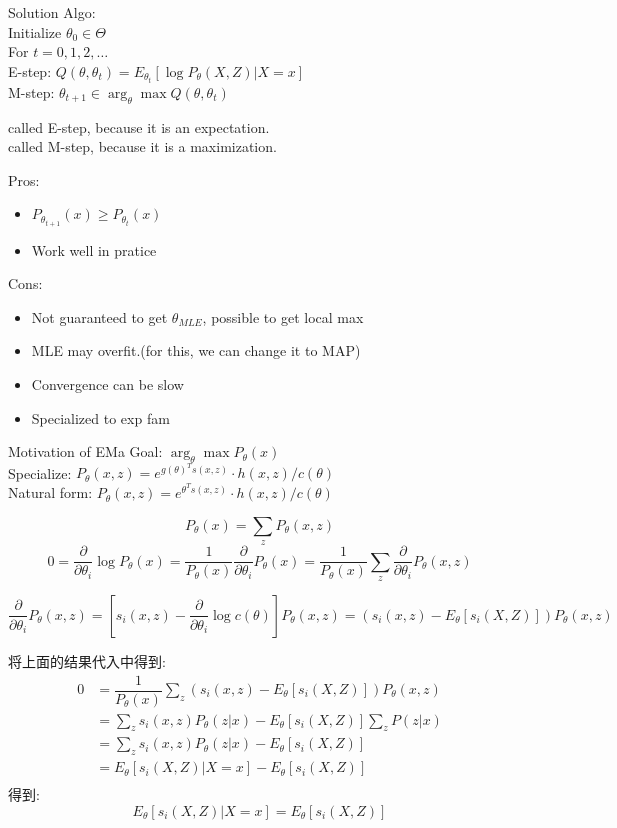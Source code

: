 \documentclass{article}
\begin{document}
Solution Algo: \\
Initialize $\theta_0 \in \Theta$\\
For $t = 0,1,2, \ldots$\\
\quad E-step: $Q(\theta, \theta_t) = E_{\theta_t}[\log P_\theta(X,Z)|X = x]$ \\
\quad M-step: $\theta_{t+1} \in \arg_\theta \max Q(\theta, \theta_t)$

\noindent
called E-step, because it is an expectation.\\
called M-step, because it is a maximization.

Pros:
\begin{itemize}
\item $P_{\theta_{t+1}}(x) \geq P_{\theta_t}(x)$
\item Work well in pratice
\end{itemize}

Cons:
\begin{itemize}
\item Not guaranteed to get $\theta_{MLE}$, possible to get local max
\item MLE may overfit.(for this, we can change it to MAP)
\item Convergence can be slow
\item Specialized to exp fam
\end{itemize}

Motivation of EMa
\noindent
Goal: $\arg_\theta \max P_\theta(x)$\\
Specialize: $P_\theta(x,z) = e^{g(\theta)^T s(x,z)} \cdot h(x,z) / c(\theta)$\\
Natural form: $P_\theta(x,z) = e^{\theta^T s(x,z)} \cdot h(x,z) / c(\theta)$

$$P_\theta(x) = \sum_z P_\theta(x,z)$$
$$
0 
= \dfrac{\partial}{\partial \theta_i} \log P_\theta(x) 
= \dfrac{1}{P_\theta(x)} \dfrac{\partial }{\partial \theta_i} P_\theta(x)
= \dfrac{1}{P_\theta(x)} \sum_z \dfrac{\partial }{\partial \theta_i} P_\theta(x,z)
$$

\begin{equation}
\dfrac{\partial }{\partial \theta_i} P_\theta(x,z)
= [s_i(x,z) - \dfrac{\partial }{\partial \theta_i} \log c(\theta)] P_\theta(x,z)
= (s_i(x,z) - E_\theta[s_i(X,Z)]) P_\theta(x,z)
\end{equation}

将上面的结果代入\lasteq 中得到:
$$
\begin{aligned}
0 
& = \dfrac{1}{P_\theta(x)} \sum_z (s_i(x,z) - E_\theta[s_i(X,Z)]) P_\theta(x,z) \\
& = \sum_z s_i(x,z)P_\theta(z|x) - E_\theta[s_i(X,Z)] \sum_z P(z|x) \\
& = \sum_z s_i(x,z)P_\theta(z|x) - E_\theta[s_i(X,Z)] \\
& = E_\theta[s_i(X,Z)|X=x] - E_\theta[s_i(X,Z)] \\
\end{aligned}
$$
得到:
$$ E_\theta[s_i(X,Z)|X=x] = E_\theta[s_i(X,Z)] $$
\end{document}
